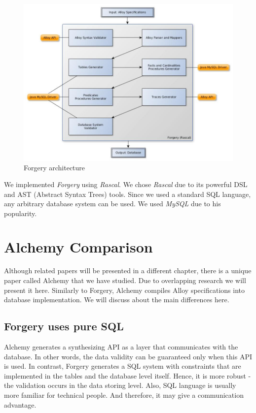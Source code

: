 \documentclass[oneside]{book}
\begin{document}
\begin{figure}[h!]
\centering
\includegraphics[scale=0.45]{forgery}
\caption{Forgery architecture}
\end{figure}

We implemented \textit{Forgery} using \textit{Rascal}. We chose \textit{Rascal} due to its powerful DSL and AST (Abstract Syntax Trees) tools. Since we used a standard SQL language, any arbitrary database system can be used. We used \textit{MySQL} due to his popularity.

\newpage

\section{Alchemy Comparison}
Although related papers will be presented in a different chapter, there is a unique paper called Alchemy \cite{alchemy} that we 
have studied. Due to overlapping research we will present it here. Similarly to Forgery, Alchemy compiles Alloy specifications into database implementation. We will discuss about the main differences here.\\

\subsection{Forgery uses pure SQL}
Alchemy generates a synthesizing API as a layer that communicates with the database. In other words, the data validity can be guaranteed only when this API is used. In contrast, Forgery generates a SQL system with constraints that are implemented in the tables and the database level itself. Hence, it is more robust - the validation occurs in the data storing level. Also, SQL language is usually more familiar for technical people. And therefore, it may give a communication advantage.\\
\end{document}
